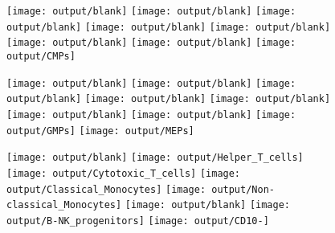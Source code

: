 \documentclass[11pt]{article}
\begin{document}
\begin{figure}[htbp]
  \centering
  \begin{minipage}[t]{0.125\textwidth}
    \texttt{[image: output/blank]}
    \texttt{[image: output/blank]}
    \texttt{[image: output/blank]}
    \texttt{[image: output/blank]}
    \texttt{[image: output/blank]}
    \texttt{[image: output/blank]}
    \texttt{[image: output/blank]}
    \texttt{[image: output/CMPs]}
  \end{minipage}%
  \begin{minipage}[t]{0.125\textwidth}
    \vspace{-0.333\linewidth} %
    \texttt{[image: output/blank]}
    \texttt{[image: output/blank]}
    \texttt{[image: output/blank]}
    \texttt{[image: output/blank]}
    \texttt{[image: output/blank]}
    \texttt{[image: output/blank]}
    \texttt{[image: output/blank]}
    \texttt{[image: output/GMPs]}
    \texttt{[image: output/MEPs]}
  \end{minipage}%
  \begin{minipage}[t]{0.125\textwidth}
    \centering
    \texttt{[image: output/blank]}
    \texttt{[image: output/Helper\_T\_cells]}
    \texttt{[image: output/Cytotoxic\_T\_cells]}
    \texttt{[image: output/Classical\_Monocytes]}
    \texttt{[image: output/Non-classical\_Monocytes]}
    \texttt{[image: output/blank]}
    \texttt{[image: output/B-NK\_progenitors]}
    \texttt{[image: output/CD10-]}
  \end{minipage}%
  \begin{minipage}[t]{0.125\textwidth}

\end{minipage}
\end{figure}
\end{document}
